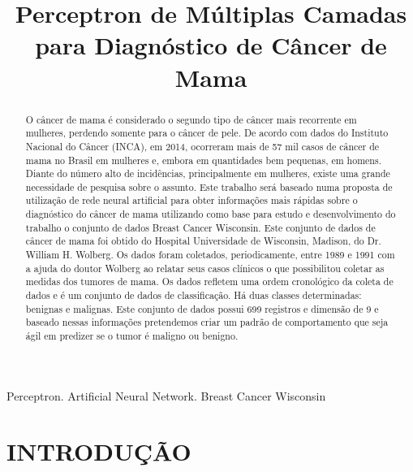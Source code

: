 \documentclass[conference]{IEEEtran}
\begin{document}
\title{Perceptron de Múltiplas Camadas para Diagnóstico de Câncer de Mama}

\author{
    \and
    \and
}
\maketitle

\begin{abstract}
O câncer de mama é considerado o segundo tipo de câncer mais recorrente em mulheres, perdendo somente para o câncer de pele. De acordo com dados do Instituto Nacional do Câncer (INCA), em 2014, ocorreram mais de 57 mil casos de câncer de mama no Brasil em mulheres e, embora em quantidades bem pequenas, em homens. Diante do número alto de incidências, principalmente em mulheres, existe uma grande necessidade de pesquisa sobre o assunto. Este trabalho será baseado numa proposta de utilização de rede neural artificial para obter informações mais rápidas sobre o diagnóstico do câncer de mama utilizando como base para estudo e desenvolvimento do trabalho o conjunto de dados Breast Cancer Wisconsin. Este conjunto de dados de câncer de mama foi obtido do Hospital Universidade de Wisconsin, Madison, do Dr. William H. Wolberg. Os dados foram coletados, periodicamente, entre 1989 e 1991 com a ajuda do doutor Wolberg ao relatar seus casos clínicos o que possibilitou coletar as medidas dos tumores de mama. Os dados refletem uma ordem cronológico da coleta de dados e é um conjunto de dados de classificação. Há duas classes determinadas: benignas e malignas. Este conjunto de dados possui 699 registros e dimensão de 9 e baseado nessas informações pretendemos criar um padrão de comportamento que seja ágil em predizer se o tumor é maligno ou benigno.

\end{abstract}

\begin{IEEEkeywords}
Perceptron. Artificial Neural Network. Breast Cancer Wisconsin
\end{IEEEkeywords}

\section{INTRODUÇÃO}
\end{document}
